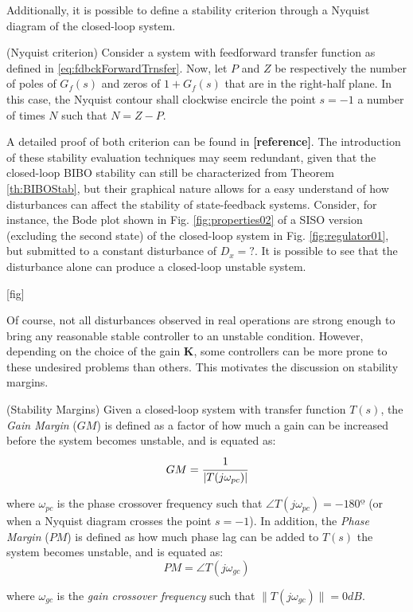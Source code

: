 \documentclass[a4paper,11pt]{book}
\numberwithin{figure}{chapter}
\numberwithin{equation}{chapter}
\numberwithin{table}{chapter}
\newtheorem{theorem}{Theorem}[chapter]
\theoremstyle{definition}
\newtheorem{definition}{Definition}[chapter]
\newcounter{boxed-theorem}
\newenvironment{boxed-theorem}[1]
{\begin{shaded} \begin{theorem}{#1}}
{\end{theorem} \end{shaded}}
\newcounter{boxed-definition}
\newenvironment{boxed-definition}[1]
{\begin{shaded} \begin{definition}{#1}}
{\end{definition} \end{shaded}}
\begin{document}
Additionally, it is possible to define a stability criterion through a Nyquist diagram of the closed-loop system.

\begin{boxed-theorem}{(Nyquist criterion)}
    Consider a system with feedforward transfer function as defined in \eqref{eq:fdbckForwardTrnsfer}. Now, let $P$ and $Z$ be respectively the number of poles of $G_{f}(s)$ and zeros of $1 + G_{f}(s)$ that are in the right-half plane. In this case, the Nyquist contour shall clockwise encircle the point $s = -1$ a number of times $N$ such that $N = Z - P$.
\end{boxed-theorem}

A detailed proof of both criterion can be found in \textbf{[reference]}. The introduction of these stability evaluation techniques may seem redundant, given that the closed-loop BIBO stability can still be characterized from Theorem \ref{th:BIBOStab}, but their graphical nature allows for a easy understand of how disturbances can affect the stability of state-feedback systems. Consider, for instance, the Bode plot shown in Fig. \ref{fig:properties02} of a SISO version (excluding the second state) of the closed-loop system in Fig. \ref{fig:regulator01}, but submitted to a constant disturbance of $D_x = ?$. It is possible to see that the disturbance alone can produce a closed-loop unstable system. 

[fig]

Of course, not all disturbances observed in real operations are strong enough to bring any reasonable stable controller to an unstable condition. However, depending on the choice of the gain $\bm{K}$, some controllers can be more prone to these undesired problems than others. This motivates the discussion on stability margins.

\begin{boxed-definition}{(Stability Margins)}
    Given a closed-loop system with transfer function $T(s)$, the \textit{Gain Margin} ($GM$) is defined as a factor of how much a gain can be increased before the system becomes unstable, and is equated as:
    \begin{equation}
        GM = \cfrac{1}{|T(j \omega_{pc})|}
    \end{equation}
    
    \noindent where $\omega_{pc}$ is the phase crossover frequency such that $\angle T(j\omega_{pc}) = -180º$ (or when a Nyquist diagram crosses the point $s = -1$). In addition, the \textit{Phase Margin} ($PM$) is defined as how much phase lag can be added to $T(s)$ the system becomes unstable, and is equated as:
    \begin{equation}
        PM = \angle T(j \omega_{gc})
    \end{equation}
    
    \noindent where $\omega_{gc}$ is the \textit{gain crossover frequency} such that $\|T(j\omega_{gc})\| = 0 dB$. 
\end{boxed-definition}
\end{document}
